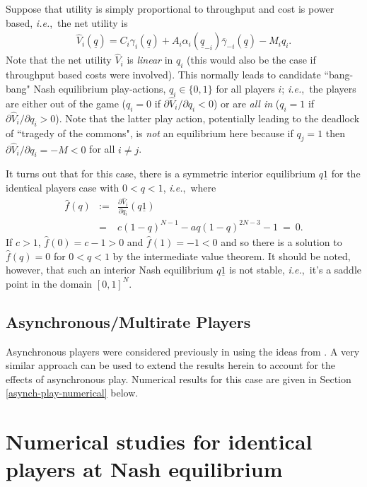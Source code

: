 \documentclass[12pt,onecolumn,draftcls]{IEEEtran}
\newcommand{\ie}{{\em i.e.},~}
\newcommand{\uq}{\underline{q}}
\newcommand{\uone}{\underline{1}}
\newcommand{\be}{\begin{eqnarray}}
\newcommand{\ee}{\end{eqnarray}}
\begin{document}
Suppose that utility is simply proportional to throughput and cost is power
based, \ie the net utility is
\be
\hat{V}_i(\uq)   =   
C_i\gamma_i(\uq)  + A_i \alpha_i(\uq_{-i})
\overline{\gamma}_{-i}(\uq) - M_i q_i.
\label{alt-util3}
\ee
Note that  the  net utility $\hat{V}_i$ is {\em linear} in $q_i$ (this
would also be the case if throughput based costs were involved).  This
normally leads to candidate ``bang-bang" Nash equilibrium play-actions,
$q_i\in\{0,1\}$ for all players $i$; \ie the players are either out of the
game ($q_i=0$ if $\partial \hat{V}_i/\partial q_i <0$) or are {\em all in}
($q_i=1$ if $\partial \hat{V}_i/\partial q_i>0$).  Note that  the latter
play action, potentially leading to the deadlock of ``tragedy of the
commons", is {\em not} an equilibrium here because if $q_j =1$ then
$\partial \hat{V}_i/\partial q_i = -M < 0$ for all $i\not= j$.

It turns out that for  this case, there is a symmetric interior equilibrium
$q\uone$ for the identical players case with $0<q<1$, \ie where
\be
\hat{f}(q) & := & \tfrac{\partial \hat{V}_i}{\partial q_i}(q\uone) \nonumber\\
& = &  c(1-q)^{N-1}-aq(1-q)^{2N-3}-1   ~ = ~  0.
\label{qstar-equ3}
\ee
If $c>1$, $\hat{f}(0)=c-1>0$ and $\hat{f}(1) =-1<0$ and so there is a
solution to $\hat{f}(q)=0$ for $0<q<1$ by the intermediate value theorem.
It should be noted, however, that such an interior Nash equilibrium
$q\uone$ is not stable, \ie it's a saddle  point in the domain $[0,1]^N$.




\subsection{Asynchronous/Multirate Players}\label{asynch-play}

Asynchronous players were considered previously in \cite{Jin05}
using the ideas from \cite{Basar95, Bertsekas89}. A very similar approach
can be used to extend the results herein to account for the effects of
asynchronous play.  Numerical results for this case are given in Section
\ref{asynch-play-numerical} below.




\section{Numerical studies for identical players at Nash equilibrium}\label{num-sec}
\end{document}
